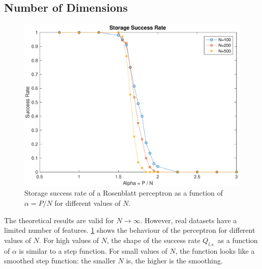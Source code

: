\subsection{Number of Dimensions}
\label{subsec:dimensions}
\begin{figure}[t]
	\centering
	\includegraphics[width=\columnwidth]{figures/multiple_n}
    \caption{Storage success rate of a Rosenblatt perceptron as a function of $\alpha = P / N$ for different values of $N$.}
	\label{fig:multiple_n}
\end{figure}
The theoretical results are valid for $N \to \infty$.
However, real datasets have a limited number of features.
\cref{fig:multiple_n} shows the behaviour of the perceptron for different values of $N$.
For high values of $N$, the shape of the success rate $Q_{l.s.}$ as a function of $\alpha$ is similar to a step function.
For small values of $N$, the function looks like a smoothed step function:
the smaller $N$ is, the higher is the smoothing.


